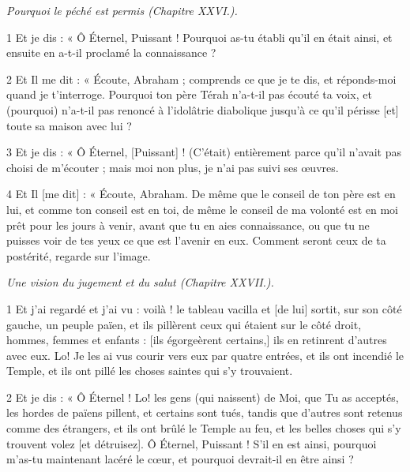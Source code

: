 
\par \textit{Pourquoi le péché est permis (Chapitre XXVI.).}

\par 1 Et je dis : « Ô Éternel, Puissant ! Pourquoi as-tu établi qu’il en était ainsi, et ensuite en a-t-il proclamé la connaissance ?

\par 2 Et Il me dit : « Écoute, Abraham ; comprends ce que je te dis, et réponds-moi quand je t'interroge. Pourquoi ton père Térah n'a-t-il pas écouté ta voix, et (pourquoi) n'a-t-il pas renoncé à l'idolâtrie diabolique jusqu'à ce qu'il périsse [et] toute sa maison avec lui ?

\par 3 Et je dis : « Ô Éternel, [Puissant] ! (C'était) entièrement parce qu'il n'avait pas choisi de m'écouter ; mais moi non plus, je n’ai pas suivi ses œuvres.

\par 4 Et Il [me dit] : « Écoute, Abraham. De même que le conseil de ton père est en lui, et comme ton conseil est en toi, de même le conseil de ma volonté est en moi prêt pour les jours à venir, avant que tu en aies connaissance, ou que tu ne puisses voir de tes yeux ce que est l'avenir en eux. Comment seront ceux de ta postérité, regarde sur l’image.


\par \textit{Une vision du jugement et du salut (Chapitre XXVII.).}

\par 1 Et j'ai regardé et j'ai vu : voilà ! le tableau vacilla et [de lui] sortit, sur son côté gauche, un peuple païen, et ils pillèrent ceux qui étaient sur le côté droit, hommes, femmes et enfants : [ils égorgeèrent certains,] ils en retinrent d'autres avec eux. Lo! Je les ai vus courir vers eux par quatre entrées, et ils ont incendié le Temple, et ils ont pillé les choses saintes qui s'y trouvaient.

\par 2 Et je dis : « Ô Éternel ! Lo! les gens (qui naissent) de Moi, que Tu as acceptés, les hordes de païens pillent, et certains sont tués, tandis que d'autres sont retenus comme des étrangers, et ils ont brûlé le Temple au feu, et les belles choses qui s'y trouvent volez [et détruisez]. Ô Éternel, Puissant ! S’il en est ainsi, pourquoi m’as-tu maintenant lacéré le cœur, et pourquoi devrait-il en être ainsi ?

